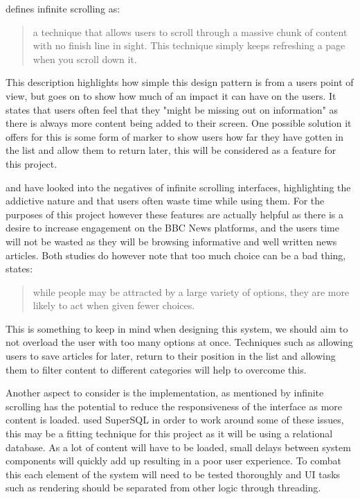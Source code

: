 \documentclass[12pt,titlepage]{article}
\begin{document}
  \cite{newtarget} defines infinite scrolling as:

  \begin{quote}
    a technique that allows users to scroll through a massive chunk of content
    with no finish line in sight. This technique simply keeps refreshing a page
    when you scroll down it.
  \end{quote}

  This description highlights how simple this design pattern is from a users
  point of view, but goes on to show how much of an impact it can have on the
  users. It states that users often feel that they "might be missing out on
  information" \cite{newtarget} as there is always more content being added to
  their screen. One possible solution it offers for this is some form of marker
  to show users how far they have gotten in the list and allow them to return
  later, this will be considered as a feature for this project.

  \cite{neyman} and \cite{karlsson} have looked into the negatives of infinite
  scrolling interfaces, highlighting the addictive nature and that users often
  waste time while using them. For the purposes of this project however these
  features are actually helpful as there is a desire to increase engagement on
  the BBC News platforms, and the users time will not be wasted as they will be
  browsing informative and well written news articles. Both studies do however
  note that too much choice can be a bad thing, \cite{karlsson} states:

  \begin{quote}
    while people may be attracted by a large variety of options, they are more
    likely to act when given fewer choices.
  \end{quote}

  This is something to keep in mind when designing this system, we should aim to
  not overload the user with too many options at once. Techniques such as
  allowing users to save articles for later, return to their position in the
  list and allowing them to filter content to different categories will help to
  overcome this.

  Another aspect to consider is the implementation, as mentioned by
  \cite{newtarget} infinite scrolling has the potential to reduce the
  responsiveness of the interface as more content is loaded. \cite{tajima} used
  SuperSQL in order to work around some of these issues, this may be a fitting
  technique for this project as it will be using a relational database. As a lot
  of content will have to be loaded, small delays between system components will
  quickly add up resulting in a poor user experience. To combat this each
  element of the system will need to be tested thoroughly and UI tasks such as
  rendering should be separated from other logic through threading.
\end{document}
